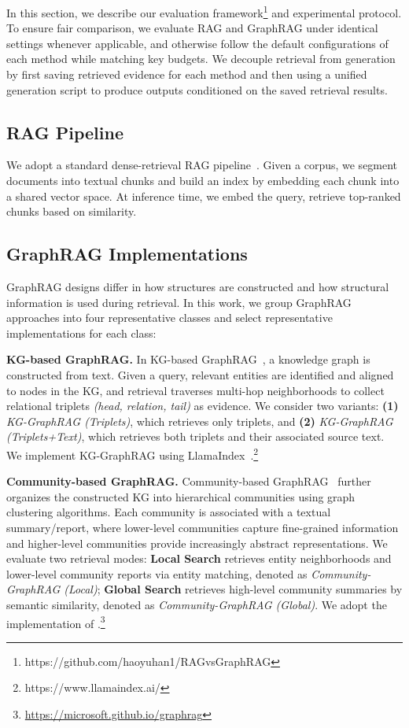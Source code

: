 In this section, we describe our evaluation framework\footnote{{https://github.com/haoyuhan1/RAGvsGraphRAG}}
 and experimental protocol. To ensure fair comparison, we evaluate RAG and GraphRAG under identical settings whenever applicable, and otherwise follow the default configurations of each method while matching key budgets. We decouple retrieval from generation by first saving retrieved evidence for each method and then using a unified generation script to produce outputs conditioned on the saved retrieval results.

\subsection{RAG Pipeline}
We adopt a standard dense-retrieval RAG pipeline~\cite{karpukhin2020dense}. 
Given a corpus, we segment documents into textual chunks and build an index by embedding each chunk into a shared vector space. 
At inference time, we embed the query, retrieve top-ranked chunks based on similarity.

\subsection{GraphRAG Implementations}
GraphRAG designs differ in how structures are constructed and how structural information is used during retrieval. 
In this work, we group GraphRAG approaches into four representative classes and select representative implementations for each class: 

\noindent \textbf{KG-based GraphRAG.}
In KG-based GraphRAG~\cite{Liu_LlamaIndex_2022}, a knowledge graph is constructed from text. 
Given a query, relevant entities are identified and aligned to nodes in the KG, and retrieval traverses multi-hop neighborhoods to collect relational triplets \textit{(head, relation, tail)} as evidence.
We consider two variants: 
{\bf (1)} {\it KG-GraphRAG (Triplets)}, which retrieves only triplets, and 
{\bf (2)} {\it KG-GraphRAG (Triplets+Text)}, which retrieves both triplets and their associated source text. 
We implement KG-GraphRAG using LlamaIndex~\cite{Liu_LlamaIndex_2022}.\footnote{{https://www.llamaindex.ai/}}

\noindent \textbf{Community-based GraphRAG.}
Community-based GraphRAG~\cite{edge2024local} further organizes the constructed KG into hierarchical communities using graph clustering algorithms. 
Each community is associated with a textual summary/report, where lower-level communities capture fine-grained information and higher-level communities provide increasingly abstract representations.
We evaluate two retrieval modes: 
{\bf Local Search} retrieves entity neighborhoods and lower-level community reports via entity matching, denoted as {\it Community-GraphRAG (Local)}; 
{\bf Global Search} retrieves high-level community summaries by semantic similarity, denoted as {\it Community-GraphRAG (Global)}.
We adopt the implementation of \citet{edge2024local}.\footnote{\url{https://microsoft.github.io/graphrag}}

